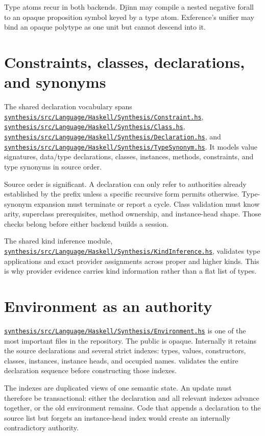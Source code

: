 \documentclass[10pt,letterpaper,oneside]{report}
\newcommand{\code}[1]{\texttt{\detokenize{#1}}}
\def\DjexBase{https://github.com/VladimirReshetnikov/Djex/blob/d3d9662598460316bdcd177ce6768c521e764aa8/}
\newcommand{\dpath}[1]{\href{\DjexBase#1}{\nolinkurl{#1}}}
\begin{document}
Type atoms recur in both backends. Djinn may compile a nested negative forall to an opaque proposition symbol keyed by a type atom. Exference's unifier may bind an opaque polytype as one unit but cannot descend into it.

\section{Constraints, classes, declarations, and synonyms}

The shared declaration vocabulary spans \dpath{synthesis/src/Language/Haskell/Synthesis/Constraint.hs}, \dpath{synthesis/src/Language/Haskell/Synthesis/Class.hs}, \dpath{synthesis/src/Language/Haskell/Synthesis/Declaration.hs}, and \dpath{synthesis/src/Language/Haskell/Synthesis/TypeSynonym.hs}. It models value signatures, data/type declarations, classes, instances, methods, constraints, and type synonyms in source order.

Source order is significant. A declaration can only refer to authorities already established by the prefix unless a specific recursive form permits otherwise. Type-synonym expansion must terminate or report a cycle. Class validation must know arity, superclass prerequisites, method ownership, and instance-head shape. Those checks belong before either backend builds a session.

The shared kind inference module, \dpath{synthesis/src/Language/Haskell/Synthesis/KindInference.hs}, validates type applications and exact provider assignments across proper and higher kinds. This is why provider evidence carries kind information rather than a flat list of types.

\section{Environment as an authority}\label{sec:djex-environment}

\dpath{synthesis/src/Language/Haskell/Synthesis/Environment.hs} is one of the most important files in the repository. The public \code{Environment} is opaque. Internally it retains the source declarations and several strict indexes: types, values, constructors, classes, instances, instance heads, and occupied names. \code{mkEnvironment} validates the entire declaration sequence before constructing those indexes.

The indexes are duplicated views of one semantic state. An update must therefore be transactional: either the declaration and all relevant indexes advance together, or the old environment remains. Code that appends a declaration to the source list but forgets an instance-head index would create an internally contradictory authority.
\end{document}
